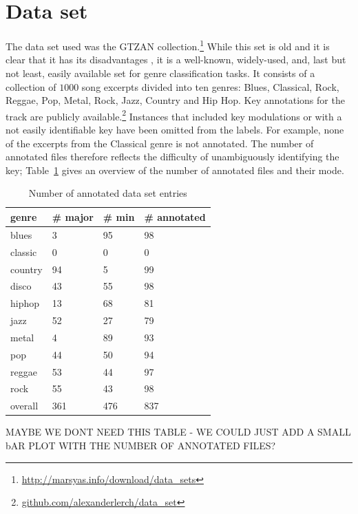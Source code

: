 \documentclass{article}
\begin{document}
\section{Data set}\label{sec:dataset}
The data set used was the GTZAN collection.\footnote{\url{http://marsyas.info/download/data_sets}} While this set is old and it is clear that it has its disadvantages \cite{sturm_analysis_2012}, it is a well-known, widely-used, and, last but not least, easily available set for genre classification tasks. It consists of a collection of $1000$ song excerpts divided into ten genres: Blues, Classical, Rock, Reggae, Pop, Metal, Rock, Jazz, Country and Hip Hop. 
Key annotations for the track are publicly available.\footnote{\url{github.com/alexanderlerch/data_set}} Instances that included key modulations or with a not easily identifiable key have been omitted from the labels. For example, none of the excerpts from the Classical genre is not annotated. 
The number of annotated files therefore reflects the difficulty of unambiguously identifying the key; Table~\ref{tab:NumberOfAnnotatedDataSetEntries} gives an overview of the number of annotated files and their mode. 
\begin{table}
    \begin{center}
        \begin{tabular}{|l|l|l|l|}
        \hline
        genre & \# major & \# min & \# annotated \\
        \hline
        blues 	&3 	    &95     &98\\
        \hline
        classic &0 	    &0 	    &0\\
        \hline
        country &94 	&5 	    &99\\
        \hline
        disco 	&43 	&55 	&98\\
        \hline
        hiphop 	&13 	&68 	&81\\
        \hline
        jazz 	&52 	&27 	&79\\
        \hline
        metal 	&4 	    &89 	&93\\
        \hline
        pop 	&44 	&50 	&94\\
        \hline
        reggae 	&53 	&44 	&97\\
        \hline
        rock 	&55 	&43 	&98\\
        \hline\hline
        overall &361    &476    &837\\
        \hline
        \end{tabular}
    \end{center}
   
	\caption{Number of annotated data set entries}
	\label{tab:NumberOfAnnotatedDataSetEntries}
\end{table}
MAYBE WE DONT NEED THIS TABLE - WE COULD JUST ADD A SMALL bAR PLOT WITH THE NUMBER OF ANNOTATED FILES?
\end{document}
